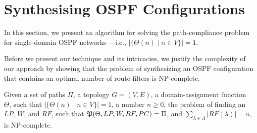 \section{Synthesising OSPF Configurations} \label{sec:synthesis}
In this section, we present an algorithm for 
solving the path-compliance problem for 
single-domain OSPF networks
---i.e., $|\{\Theta(n) \mid n\in V\}|=1$.


Before we present our technique and its intricacies,
we justify the complexity of our approach by showing that
the problem of synthesizing an OSPF configuration
that contains an optimal number of route-filters is NP-complete.

\begin{theorem}
Given a set of paths $\Pi$,
a topology $G=(V,E)$,
a domain-assignment function $\Theta$, such that $|\{\Theta(n) \mid n\in V\}|=1$,
a number $n\geq 0$,
the problem of finding 
an $LP$, $W$, and $RF$,  such that
$\mathfrak{P}(\Theta, LP, W, RF, PC) = \Pi$,
and 
$\sum_{\lambda\in\Lambda} |RF(\lambda)|=n$, is NP-complete.
\end{theorem}
\iffull

\fi

%

